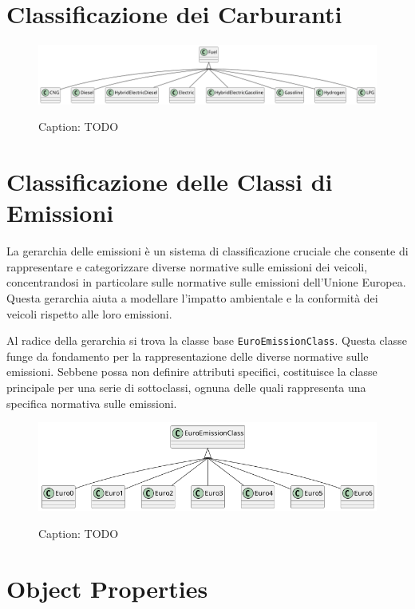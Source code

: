 \section{Classificazione dei Carburanti}

\begin{figure}[H]
    \caption{Caption: TODO}
    \includegraphics[width=\textwidth]{figures/carpedia-fuel.png}
    \label{fig:carpedia-fuel}
\end{figure}

\section{Classificazione delle Classi di Emissioni}

La gerarchia delle emissioni è un sistema di classificazione cruciale che  consente di rappresentare e categorizzare diverse normative sulle emissioni dei veicoli, concentrandosi in particolare sulle normative sulle emissioni dell'Unione Europea. Questa gerarchia aiuta a modellare l'impatto ambientale e la conformità dei veicoli rispetto alle loro emissioni.

Al radice della gerarchia si trova la classe base \texttt{EuroEmissionClass}. Questa classe funge da fondamento per la rappresentazione delle diverse normative sulle emissioni. Sebbene possa non definire attributi specifici, costituisce la classe principale per una serie di sottoclassi, ognuna delle quali rappresenta una specifica normativa sulle emissioni.

\begin{figure}[H]
    \caption{Caption: TODO}
    \includegraphics[width=\textwidth]{figures/carpedia-euro-emission.png}
    \label{fig:carpedia-euro-emission}
\end{figure}

\section{Object Properties}


